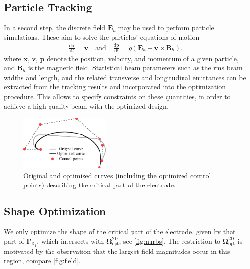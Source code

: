 \documentclass[journal, transmag]{IEEEtran}
\begin{document}
    \subsection{Particle Tracking}
    In a second step, the discrete field $\mathbf{E}_h$ may be used to perform particle simulations. These aim to solve the particles' equations of motion
    \begin{align*}
        \frac{\mathrm{d}\mathbf{x}}{\mathrm{d}t} = \mathbf{v} \quad \text{and} \quad \frac{\mathrm{d}\mathbf{p}}{\mathrm{d}t} = q (\mathbf{E}_h + \mathbf{v} \times \mathbf{B}_h),
    \end{align*}
    where $\mathbf{x}$, $\mathbf{v}$, $\mathbf{p}$ denote the position, velocity, and momentum of a given particle, and $\mathbf{B}_h$ is the magnetic field. Statistical beam parameters such as the rms beam widths and length, and the related transverse and longitudinal emittances can be extracted from the tracking results and incorporated into the optimization procedure. This allows to specify constraints on these quantities, in order to achieve a high quality beam with the optimized design.

    \begin{figure}[b]
        \begin{center}
        \includegraphics[width=0.4\textwidth]{nurbs}
        \caption{Original and optimized curves (including the optimized control points) describing the critical part of the electrode.}
        \label{fig:nurbs}
        \end{center}
    \end{figure}

    \subsection{Shape Optimization}
    We only optimize the shape of the critical part of the electrode, given by that part of $\boldsymbol{\Gamma}_{\mathrm{D}_1}$, which intersects with $\boldsymbol{\Omega}_{\mathrm{opt}}^{\mathrm{2D}}$, see \autoref{fig:nurbs}. The restriction to $\boldsymbol{\Omega}_{\mathrm{opt}}^{\mathrm{2D}}$ is motivated by the observation that the largest field magnitudes occur in this region, compare \autoref{fig:field}.
\end{document}
